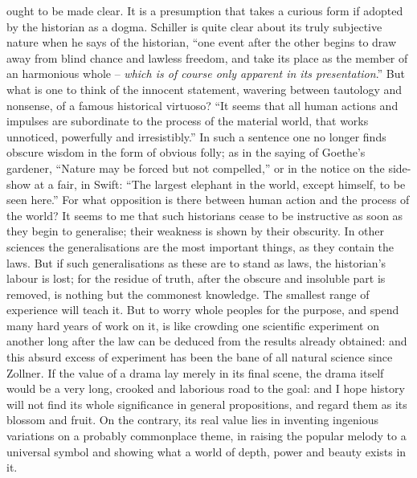 ought to be made clear. It is a presumption that takes a curious form
if adopted by the historian as a dogma. Schiller is quite clear about
its truly subjective nature when he says of the historian, \enquote{one event
after the other begins to draw away from blind chance and lawless
freedom, and take its place as the member of an harmonious
whole -- \textit{which is of course only apparent in its presentation}.} But
what is one to think of the innocent statement, wavering between
tautology and nonsense, of a famous historical virtuoso? \enquote{It seems
that all human actions and impulses are subordinate to the process of
the material world, that works unnoticed, powerfully and
irresistibly.} In such a sentence one no longer finds obscure wisdom
in the form of obvious folly; as in the saying of Goethe's gardener,
\enquote{Nature may be forced but not compelled,} or in the notice on the
side-show at a fair, in Swift: \enquote{The largest elephant in the world,
except himself, to be seen here.} For what opposition is there
between human action and the process of the world? It seems to me
that such historians cease to be instructive as soon as they begin to
generalise; their weakness is shown by their obscurity. In other
sciences the generalisations are the most important things, as they
contain the laws. But if such generalisations as these are to stand
as laws, the historian's labour is lost; for the residue of truth,
after the obscure and insoluble part is removed, is nothing but the
commonest knowledge. The smallest range of experience will teach it.
But to worry whole peoples for the purpose, and spend many hard years
of work on it, is like crowding one scientific experiment on another
long after the law can be deduced from the results already obtained:
and this absurd excess of experiment has been the bane of all natural
science since Zollner. If the value of a drama lay merely in its
final scene, the drama itself would be a very long, crooked and
laborious road to the goal: and I hope history will not find its
whole significance in general propositions, and regard them as its
blossom and fruit. On the contrary, its real value lies in inventing
ingenious variations on a probably commonplace theme, in raising the
popular melody to a universal symbol and showing what a world of
depth, power and beauty exists in it.

